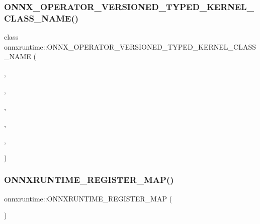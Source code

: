 \subsubsection{\texorpdfstring{O\+N\+N\+X\+\_\+\+O\+P\+E\+R\+A\+T\+O\+R\+\_\+\+V\+E\+R\+S\+I\+O\+N\+E\+D\+\_\+\+T\+Y\+P\+E\+D\+\_\+\+K\+E\+R\+N\+E\+L\+\_\+\+C\+L\+A\+S\+S\+\_\+\+N\+A\+M\+E()}{ONNX\_OPERATOR\_VERSIONED\_TYPED\_KERNEL\_CLASS\_NAME()}\hspace{0.1cm}{\footnotesize\ttfamily [2/2]}}
{\footnotesize\ttfamily class onnxruntime\+::\+O\+N\+N\+X\+\_\+\+O\+P\+E\+R\+A\+T\+O\+R\+\_\+\+V\+E\+R\+S\+I\+O\+N\+E\+D\+\_\+\+T\+Y\+P\+E\+D\+\_\+\+K\+E\+R\+N\+E\+L\+\_\+\+C\+L\+A\+S\+S\+\_\+\+N\+A\+ME (\begin{DoxyParamCaption}\item[{\mbox{\hyperlink{namespaceonnxruntime_a394a3c7e50622de1f203a96df592060d}{k\+Cpu\+Execution\+Provider}}}]{,  }\item[{\mbox{\hyperlink{namespaceonnxruntime_ac0e7c0c106a2c9e9594560a3ab289fa0}{k\+Onnx\+Domain}}}]{,  }\item[{7}]{,  }\item[{9}]{,  }\item[{float}]{,  }\item[{\mbox{\hyperlink{classonnxruntime_1_1Less}{Less}}}]{ }\end{DoxyParamCaption})}

\mbox{\label{namespaceonnxruntime_a8e441dc586feb02243cbf91dcd2a9906}} 
\subsubsection{\texorpdfstring{O\+N\+N\+X\+R\+U\+N\+T\+I\+M\+E\+\_\+\+R\+E\+G\+I\+S\+T\+E\+R\+\_\+\+M\+A\+P()}{ONNXRUNTIME\_REGISTER\_MAP()}\hspace{0.1cm}{\footnotesize\ttfamily [1/8]}}
{\footnotesize\ttfamily onnxruntime\+::\+O\+N\+N\+X\+R\+U\+N\+T\+I\+M\+E\+\_\+\+R\+E\+G\+I\+S\+T\+E\+R\+\_\+\+M\+AP (\begin{DoxyParamCaption}\item[{\mbox{\hyperlink{namespaceonnxruntime_ad08e9cd3839f6134e87cee3370f5d7b3}{Map\+String\+To\+String}}}]{ }\end{DoxyParamCaption})}

